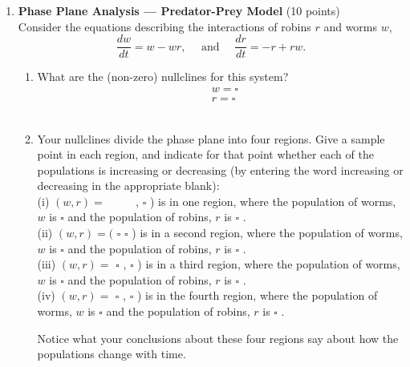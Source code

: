 \begin{enumerate}
  \item \textbf{Phase Plane Analysis --- Predator-Prey Model} (10 points)\\
  Consider the equations describing the interactions of robins $r$ and worms $w$,
  $$
  \frac{d w}{d t}=w-w r, \quad \text { and } \quad \frac{d r}{d t}=-r+r w .
  $$
  \begin{enumerate}[label=(\alph*)]
    \item What are the (non-zero) nullclines for this system?\\
    $$
    \begin{aligned}
    & w=\square \\
    & r=\square
    \end{aligned}
    $$\\
    \begin{subanswer}
    \end{subanswer}
    \item Your nullclines divide the phase plane into four regions. Give a sample point in each region, and indicate for that point whether each of the populations is increasing or decreasing (by entering the word increasing or decreasing in the appropriate blank):\\
    (i) $(w, r)=$ $\qquad$ , $\square$ ) is in one region, where the population of worms, $w$ is $\square$ and the population of robins, $r$ is $\square$ .\\
    (ii) $(w, r)=($ $\square$ $\square$ ) is in a second region, where the population of worms, $w$ is $\square$ and the population of robins, $r$ is $\square$ .\\
    (iii) $(w, r)=$ $\square$ , $\square$ ) is in a third region, where the population of worms, $w$ is $\square$ and the population of robins, $r$ is $\square$ .\\
    (iv) $(w, r)=$ $\square$ , $\square$ ) is in the fourth region, where the population of worms, $w$ is $\square$ and the population of robins, $r$ is $\square$ .\\
    \begin{subanswer}
    \end{subanswer}
    Notice what your conclusions about these four regions say about how the populations change with time.
  \end{enumerate}


\end{enumerate}
